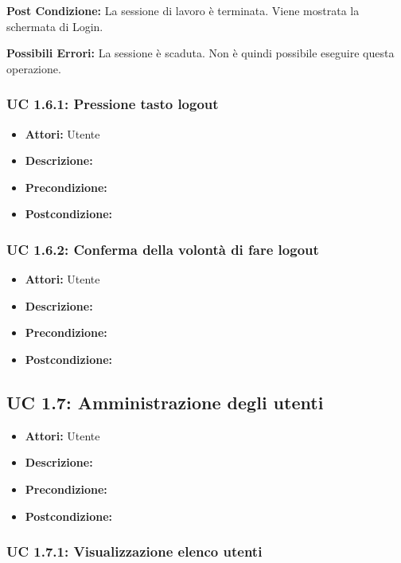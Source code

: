 \textbf{Post Condizione:}
La sessione di lavoro è terminata. Viene mostrata la schermata di Login.

\textbf{Possibili Errori:}
La sessione è scaduta. Non è quindi possibile eseguire questa operazione.

\subsubsection{UC 1.6.1: Pressione tasto logout}

\begin{itemize}
\item \textbf{Attori:} Utente
\item \textbf{Descrizione:} 
\item \textbf{Precondizione:} 
\item \textbf{Postcondizione:} 
\end{itemize}

\subsubsection{UC 1.6.2: Conferma della volontà di fare logout}

\begin{itemize}
\item \textbf{Attori:} Utente
\item \textbf{Descrizione:} 
\item \textbf{Precondizione:} 
\item \textbf{Postcondizione:} 
\end{itemize}



\subsection{UC 1.7: Amministrazione degli utenti}

\begin{itemize}
\item \textbf{Attori:} Utente
\item \textbf{Descrizione:} 
\item \textbf{Precondizione:} 
\item \textbf{Postcondizione:} 
\end{itemize}

\subsubsection{UC 1.7.1: Visualizzazione elenco utenti}

